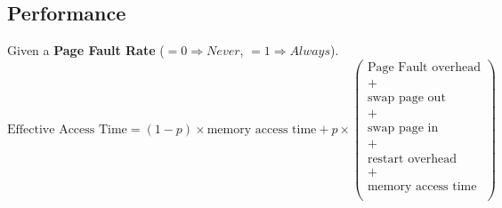 \documentclass{report}
\begin{document}
        \subsection*{Performance}
            Given a \textbf{Page Fault Rate} ($=0 \Rightarrow Never$, $=1 \Rightarrow Always$).
            \[\text{Effective Access Time} = (1-p) \times \text{memory access time} + p \times (\begin{matrix}
                \text{Page Fault overhead} \\ + \\
                 \text{swap page out} \\ + \\
                 \text{swap page in} \\ + \\
                 \text{restart overhead} \\ + \\
                 \text{memory access time} \\
            \end{matrix})\]
\end{document}
